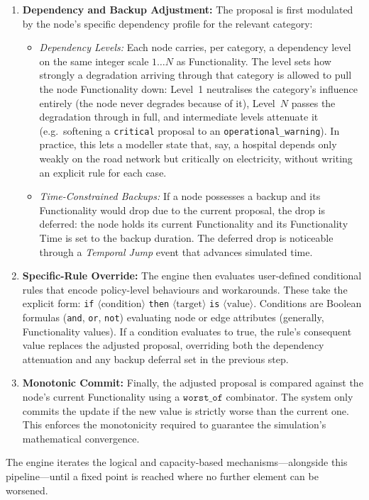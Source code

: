 \documentclass[review,12pt]{elsarticle}
\begin{document}
\begin{enumerate}
  \item \textbf{Dependency and Backup Adjustment:} The proposal is first modulated by the node's specific dependency profile for the relevant category:
    \begin{itemize}
      \item \emph{Dependency Levels:} Each node carries, per category, a dependency level on the same integer scale $1\ldots N$ as Functionality. The level sets how strongly a degradation arriving through that category is allowed to pull the node Functionality down: Level~1 neutralises the category's influence entirely (the node never degrades because of it), Level~$N$ passes the degradation through in full, and intermediate levels attenuate it (e.g.\ softening a \texttt{critical} proposal to an \texttt{operational\_warning}). In practice, this lets a modeller state that, say, a hospital depends only weakly on the road network but critically on electricity, without writing an explicit rule for each case.

      \item \emph{Time-Constrained Backups:} If a node possesses a backup and its Functionality would drop due to the current proposal,  the drop is deferred: the node holds its current Functionality and its Functionality Time is set to the backup duration. The deferred drop is noticeable through a  \emph{Temporal Jump} event that advances simulated time.
    \end{itemize}
  \item \textbf{Specific-Rule Override:} The engine then evaluates user-defined conditional rules that encode policy-level behaviours and workarounds. These take the explicit form:
    \texttt{if} $\langle\text{condition}\rangle$ \texttt{then}
    $\langle\text{target}\rangle$ \texttt{is} $\langle\text{value}\rangle$.
    Conditions are Boolean formulas (\texttt{and}, \texttt{or}, \texttt{not})  evaluating node or edge attributes (generally, Functionality values). If a condition evaluates to true, the rule's consequent value replaces the adjusted proposal, overriding both the dependency attenuation and any
    backup deferral set in the previous step.
  \item \textbf{Monotonic Commit:} Finally, the adjusted proposal is compared against the node's current Functionality using a $\texttt{worst\_of}$ combinator. The system only commits the update if the new value is strictly worse than the current one. This enforces the monotonicity required to guarantee the simulation's mathematical convergence.
\end{enumerate}
The engine iterates the logical and capacity-based mechanisms---alongside this pipeline---until a fixed point is reached where no further element can be worsened.
\end{document}
